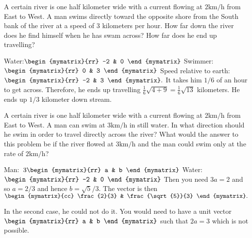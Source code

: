 \begin{enumialphparenastyle}
\begin{ex} A certain river is one half kilometer wide with a current flowing at $2\textrm{km}/\textrm{h}$ from East to West. A man swims directly toward the
opposite shore from the South bank of the river at a speed of $3$ kilometers
per hour. How far down the river does he find himself when he has swam
across? How far does he end up travelling? \vspace{1mm}
\begin{sol}
Water:$\begin{mymatrix}{rr}
-2 & 0
\end{mymatrix} $ 
Swimmer:$\begin{mymatrix}{rr}
0 & 3
\end{mymatrix} $ 
Speed relative to earth: $\begin{mymatrix}{rr}
 -2 & 3
\end{mymatrix} .$ 
It takes him $1/6$ of an hour to get across. Therefore, he ends up travelling $\frac{1}{6}\sqrt{4+9}= \frac{1}{6}\sqrt{13}$ kilometers. He ends up $1/3$ kilometer
down stream.
\end{sol}
\end{ex}

\begin{ex} A certain river is one half kilometer wide with a current flowing at $2\textrm{km}/\textrm{h}$ from East to West. A man can swim at $3\textrm{km}/\textrm{h}$ in
still water. In what direction should he swim in order to travel directly
across the river? What would the answer to this problem be if the river
flowed at $3\textrm{km}/\textrm{h}$ and the man could swim only at the rate of $2\textrm{km}/\textrm{h}$? \vspace{1mm}
\begin{sol}
Man:\ $3\begin{mymatrix}{rr}
 a & b
\end{mymatrix} $ 
Water:\ $\begin{mymatrix}{rr}
-2 & 0
\end{mymatrix} $
Then you need $3a=2$ and so $a=2/3$ and hence $b=\sqrt{5}/3$. The vector is
then $\begin{mymatrix}{cc}
 \frac{2}{3} & \frac{\sqrt{5}}{3}
\end{mymatrix} .$ 

In the second case, he
could not do it. You would need to have a unit vector $\begin{mymatrix}{rr} a & b
\end{mymatrix} $
such that $2a=3$ which is not possible. 
\end{sol}
\end{ex}



\end{enumialphparenastyle}
